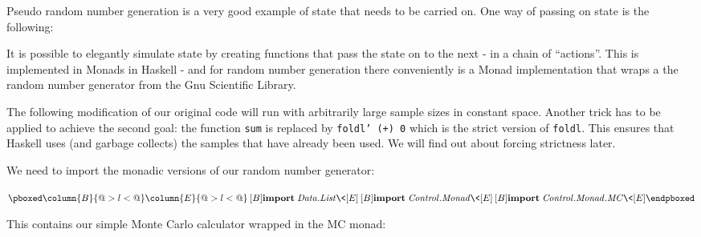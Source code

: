 \documentclass{scrartcl}
\newcommand{\Conid}[1]{\mathit{#1}}
\def\resethooks{%
  \global\let\SaveRestoreHook\empty
  \global\let\ColumnHook\empty}
\let\hspre\empty
\let\hspost\empty
\newenvironment{colorcode}{%
  \colorsurround
  \(%
  \pboxed\SaveRestoreHook}{%
  \ColumnHook\endpboxed
  \)%
  \endcolorsurround}
\begin{document}
Pseudo random number generation is a very good example of state that needs to be carried on. One way of passing on state is the following:

It is possible to elegantly simulate state by creating functions that pass the state on to the next - in a chain of ``actions''. This is implemented in Monads in Haskell - and for random number generation there conveniently is a Monad implementation that wraps a the random number generator from the Gnu Scientific Library.

The following modification of our original code will run with arbitrarily large sample sizes in constant space. Another trick has to be applied to achieve the second goal: the function {\tt sum} is replaced by {\tt foldl' (+) 0} which is the strict version of {\tt foldl}. This ensures that Haskell uses (and garbage collects) the samples that have already been used. We will find out about forcing strictness later.

We need to import the monadic versions of our random number generator:

\begin{colorcode}
\column{B}{@{}>{\hspre}l<{\hspost}@{}}%
\column{E}{@{}>{\hspre}l<{\hspost}@{}}%
\>[B]{}\mathbf{import}\;\Conid{\Conid{Data}.List}{}\<[E]%
\\
\>[B]{}\mathbf{import}\;\Conid{\Conid{Control}.Monad}{}\<[E]%
\\
\>[B]{}\mathbf{import}\;\Conid{\Conid{Control}.\Conid{Monad}.MC}{}\<[E]%
\end{colorcode}\resethooks

This contains our simple Monte Carlo calculator wrapped in the MC monad:
\end{document}
